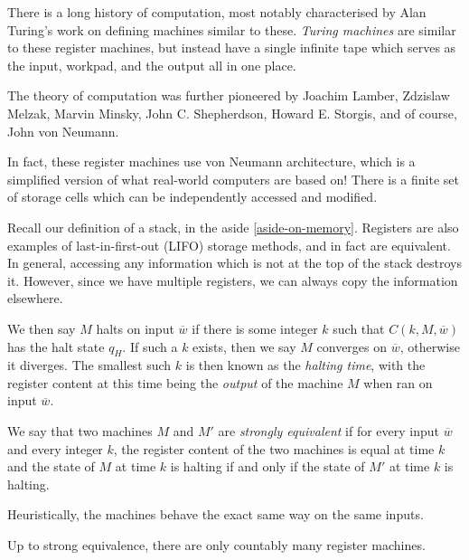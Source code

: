 \documentclass{article}
\begin{document}
\begin{remark}
	\label{turing-machine}
	There is a long history of computation, most notably characterised by Alan Turing's work on defining machines similar to these. \textit{Turing machines} are similar to these register machines, but instead have a single infinite tape which serves as the input, workpad, and the output all in one place.
	    
	The theory of computation was further pioneered by Joachim Lamber, Zdzislaw Melzak, Marvin Minsky, John C. Shepherdson, Howard E. Storgis, and of course, John von Neumann.
	    
	In fact, these register machines use von Neumann architecture, which is a simplified version of what real-world computers are based on! There is a finite set of storage cells which can be independently accessed and modified.
\end{remark}

Recall our definition of a stack, in the aside \ref{aside-on-memory}. Registers are also examples of last-in-first-out (LIFO) storage methods, and in fact are equivalent. In general, accessing any information which is not at the top of the stack destroys it. However, since we have multiple registers, we can always copy the information elsewhere.

We then say $M$ halts on input $\overline w$ if there is some integer $k$ such that $C(k, M, \overline w)$ has the halt state $q_H$. If such a $k$ exists, then we say $M$ converges on $\overline w$, otherwise it diverges. The smallest such $k$ is then known as the \textit{halting time}, with the register content at this time being the \textit{output} of the machine $M$ when ran on input $\overline w$.

\begin{definition}
	We say that two machines $M$ and $M'$ are \textit{strongly equivalent} if for every input $\overline w$ and every integer $k$, the register content of the two machines is equal at time $k$ and the state of $M$ at time $k$ is halting if and only if the state of $M'$ at time $k$ is halting.
\end{definition}

Heuristically, the machines behave the exact same way on the same inputs.

\begin{proposition}
	\label{countably-many-machines}
	Up to strong equivalence, there are only countably many register machines.
\end{proposition}
\end{document}
